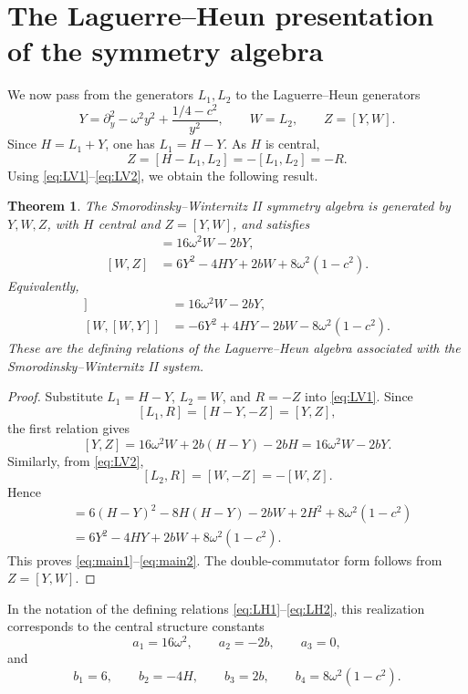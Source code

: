 \documentclass[11pt]{article}
\numberwithin{equation}{section}
\newtheorem{theorem}{Theorem}[section]
\theoremstyle{definition}
\theoremstyle{remark}
\begin{document}
\section{The Laguerre--Heun presentation of the symmetry algebra}

We now pass from the generators \(L_1,L_2\) to the Laguerre--Heun generators
\begin{equation}
        Y=\partial_y^2-\omega^2y^2+\frac{1/4-c^2}{y^2},
        \qquad W=L_2,\qquad Z=[Y,W].
        \label{eq:assignment}
\end{equation}
Since \(H=L_1+Y\), one has \(L_1=H-Y\).  As \(H\) is central,
\[
        Z=[H-L_1,L_2]=-[L_1,L_2]=-R.
\]
Using \eqref{eq:LV1}--\eqref{eq:LV2}, we obtain the following result.

\begin{theorem}
The Smorodinsky--Winternitz II symmetry algebra is generated by \(Y,W,Z\),
with \(H\) central and \(Z=[Y,W]\), and satisfies
\begin{align}
 [Y,Z]&=16\omega^2W-2bY,                                      \label{eq:main1}\\
 [W,Z]&=6Y^2-4HY+2bW+8\omega^2(1-c^2).                         \label{eq:main2}
\end{align}
Equivalently,
\begin{align}
 [Y,[Y,W]]&=16\omega^2W-2bY,                                  \label{eq:double1}\\
 [W,[W,Y]]&=-6Y^2+4HY-2bW-8\omega^2(1-c^2).                    \label{eq:double2}
\end{align}
These are the defining relations of the Laguerre--Heun algebra associated
with the Smorodinsky--Winternitz II system.
\end{theorem}

\begin{proof}
Substitute \(L_1=H-Y\), \(L_2=W\), and \(R=-Z\) into
\eqref{eq:LV1}.  Since
\[
        [L_1,R]=[H-Y,-Z]=[Y,Z],
\]
the first relation gives
\[
 [Y,Z]
 =
 16\omega^2W+2b(H-Y)-2bH
 =
 16\omega^2W-2bY.
\]
Similarly, from \eqref{eq:LV2},
\[
        [L_2,R]=[W,-Z]=-[W,Z].
\]
Hence
\begin{align*}
[W,Z]
&=
6(H-Y)^2-8H(H-Y)-2bW+2H^2+8\omega^2(1-c^2)  \\
&=
6Y^2-4HY+2bW+8\omega^2(1-c^2).
\end{align*}
This proves \eqref{eq:main1}--\eqref{eq:main2}.  The double-commutator form
follows from \(Z=[Y,W]\).
\end{proof}

In the notation of the defining relations \eqref{eq:LH1}--\eqref{eq:LH2}, this realization
corresponds to the central structure constants
\[
        a_1=16\omega^2,\qquad a_2=-2b,\qquad a_3=0,
\]
and
\[
        b_1=6,\qquad b_2=-4H,\qquad b_3=2b,\qquad
        b_4=8\omega^2(1-c^2).
\]
\end{document}
